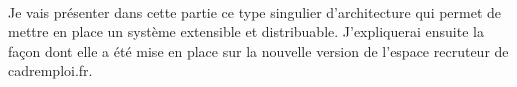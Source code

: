 \paragraph{}
Je vais présenter dans cette partie ce type singulier d'architecture qui permet de mettre en place un système extensible et distribuable.
J'expliquerai ensuite la façon dont elle a été mise en place sur la nouvelle version de l'espace recruteur de cadremploi.fr.




